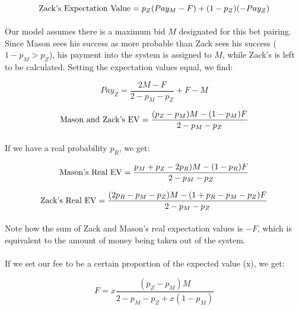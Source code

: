 \documentclass[12pt,letterpaper]{article}
\begin{document}
\begin{equation}
\textnormal{Zack's Expectation Value} = p_Z (Pay_M - F) + (1 - p_Z )(-Pay_Z)
\end{equation}

\paragraph{} Our model assumes there is a maximum bid $M$ designated for this bet pairing. Since Mason sees his success as more probable than Zack sees his success ($1 - p_M > p_Z$), his payment into the system is assigned to $M$, while Zack’s is left to be calculated. Setting the expectation values equal, we find:

\begin{equation}
Pay_Z = \frac{2M - F}{2- p_M - p_Z} + F - M
\end{equation}

\begin{equation}
\textnormal{Mason and Zack's EV} = \frac{(p_Z - p_M)M - (1 - p_M) F}{2 - p_M - p_Z}
\end{equation}

\paragraph{} If we have a real probability $p_R$, we get:

\begin{equation}
\textnormal{Mason's Real EV} = \frac{p_M + p_Z - 2p_R)M - (1 - p_R)F}{2- p_M - p_Z}
\end{equation}

\begin{equation}
\textnormal{Zack's Real EV} = \frac{(2p_R - p_M - p_Z)M - (1 + p_R - p_M - p_Z)F}{2 - p_M - p_Z}
\end{equation}

\paragraph{} Note how the sum of Zack and Mason’s real expectation values is $-F$, which is equivalent to the amount of money being taken out of the system.

\paragraph{} If we set our fee to be a certain proportion of the expected value (x), we get:

\begin{equation}
F = x \frac{(p_Z - p_M)M}{2 - p_M - p_Z + x(1 - p_M)}
\end{equation}
\end{document}
